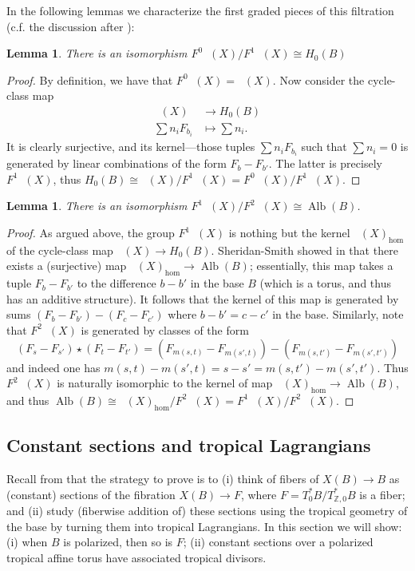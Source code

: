 \documentclass[10pt]{amsart}
\newcounter{mainthm}
\newtheorem{lem}[thm]{Lemma}
\theoremstyle{definition}
\theoremstyle{remark}
\def\Z{\mathbb{Z}}
\DeclareMathOperator{\Alb}{Alb}
\DeclareMathOperator{\Cobfib}{\mathrm{Cob}_{\mathrm{fib}}}
\begin{document}
In the following lemmas we characterize the first graded pieces of this filtration (c.f. the discussion after ):
\begin{lem}\label{lem:F0F1}
    There is an isomorphism $F^0 \Cobfib(X)/F^1 \Cobfib(X) \cong H_0(B)$  
\end{lem}
\begin{proof}
    By definition, we have that $F^0 \Cobfib(X) = \Cobfib(X)$. 
    Now consider the cycle-class map
    \begin{align*}
        \Cobfib(X) & \to H_0(B)\\
        \sum n_i F_{b_i} &\mapsto \sum n_i.
    \end{align*}
    It is clearly surjective, and its kernel---those tuples $\sum n_i F_{b_i}$ such that $\sum n_i=0$ is generated by linear combinations of the form $F_{b} - F_{b'}$. 
    The latter is precisely $F^1 \Cobfib(X)$, thus $H_0(B)\cong \Cobfib(X)/F^1 \Cobfib(X) = F^0 \Cobfib(X) /F^1 \Cobfib(X)$.
\end{proof}
    
\begin{lem}\label{lem:F1F2}
    There is an isomorphism $F^1 \Cobfib(X)/F^2 \Cobfib(X) \cong \Alb(B)$.
\end{lem}
\begin{proof}
    As argued above, the group $F^1\Cobfib(X)$ is nothing but the kernel $\Cobfib(X)_{\hom}$ of the cycle-class map $\Cobfib(X)\to H_0(B)$.
    Sheridan-Smith showed in \cite[Lemma 2.10]{sheridan2021lagrangian} that there exists a (surjective) map $\Cobfib(X)_{\hom} \to \Alb(B)$; essentially, this map takes a tuple $F_b - F_{b'}$ to the difference $b-b'$ in the base $B$ (which is a torus, and thus has an additive structure).
    It follows that the kernel of this map is generated by sums $(F_b - F_{b'}) - (F_c - F_{c'})$ where $b - b' = c - c'$ in the base.
    Similarly, note that $F^2\Cobfib(X)$ is generated by classes of the form
    $$
        (F_s - F_{s'})\star(F_t - F_{t'}) = (F_{m(s,t)} - F_{m(s',t)}) - (F_{m(s,t')} - F_{m(s',t')})
    $$
    and indeed one has $m(s, t)-m(s',t)=s-s'=m(s,t')-m(s',t')$.
    Thus $F^2\Cobfib(X)$ is naturally isomorphic to the kernel of map $\Cobfib(X)_{\hom} \to \Alb(B)$, and thus $\Alb(B)\cong\Cobfib(X)_{\hom}/F^2\Cobfib(X) = F^1\Cobfib(X)/F^2\Cobfib(X)$.
\end{proof}

 \subsection{Constant sections and tropical Lagrangians}\label{sec:constantsections}
Recall from  that the strategy to prove  is to (i) think of fibers of $X(B) \to B$ as (constant) sections of the fibration $X(B) \to F$, where $F = T_0^* B / T_{\Z,0}^* B$ is a fiber; and (ii) study (fiberwise addition of) these sections using the tropical geometry of the base by turning them into tropical Lagrangians.
In this section we will show: (i) when $B$ is polarized, then so is $F$; (ii) constant sections over a polarized tropical affine torus have associated tropical divisors.
\end{document}
